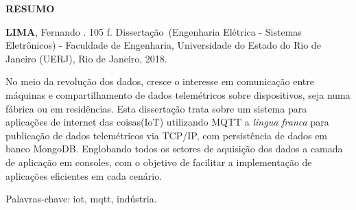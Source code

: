 \begin{center}
\textbf{RESUMO}
\end{center}

%
%

$\!$\\

\hspace{-1.3cm}\textbf{LIMA}, Fernando \textit{\setTitulo}. 105 f. Dissertação~(Engenharia Elétrica - Sistemas Eletrônicos) - Faculdade de Engenharia, Universidade do Estado do Rio de Janeiro (UERJ), Rio de Janeiro, 2018.

\vspace{.2cm}

No meio da revolução dos dados, cresce o interesse em comunicação entre máquinas e compartilhamento de dados telemétricos sobre dispositivos, seja numa fábrica ou em residências. Esta dissertação trata sobre um sistema para aplicações de internet das coisas(IoT) utilizando MQTT a \textit{lingua franca} para publicação de dados telemétricos via TCP/IP, com persistência de dados em banco MongoDB. Englobando todos os setores de aquisição dos dados a camada de aplicação em consoles, com o objetivo de facilitar a implementação de aplicações eficientes em cada cenário.

\vspace{1cm}

\hspace{-1.3cm}Palavras-chave: iot, mqtt, indústria.